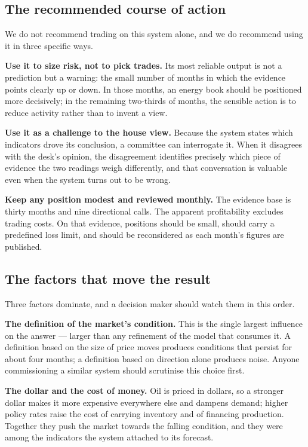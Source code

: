 \documentclass[11pt,a4paper]{article}
\begin{document}
\subsection{The recommended course of action}

We do not recommend trading on this system alone, and we do recommend using it in three specific
ways.

\textbf{Use it to size risk, not to pick trades.} Its most reliable output is not a prediction but
a warning: the small number of months in which the evidence points clearly up or down. In those
months, an energy book should be positioned more decisively; in the remaining two-thirds of months,
the sensible action is to reduce activity rather than to invent a view.

\textbf{Use it as a challenge to the house view.} Because the system states which indicators drove
its conclusion, a committee can interrogate it. When it disagrees with the desk's opinion, the
disagreement identifies precisely which piece of evidence the two readings weigh differently, and
that conversation is valuable even when the system turns out to be wrong.

\textbf{Keep any position modest and reviewed monthly.} The evidence base is thirty months and nine
directional calls. The apparent profitability excludes trading costs. On that evidence, positions
should be small, should carry a predefined loss limit, and should be reconsidered as each month's
figures are published.

\subsection{The factors that move the result}

Three factors dominate, and a decision maker should watch them in this order.

\textbf{The definition of the market's condition.} This is the single largest influence on the
answer --- larger than any refinement of the model that consumes it. A definition based on the size
of price moves produces conditions that persist for about four months; a definition based on
direction alone produces noise. Anyone commissioning a similar system should scrutinise this
choice first.

\textbf{The dollar and the cost of money.} Oil is priced in dollars, so a stronger dollar makes it
more expensive everywhere else and dampens demand; higher policy rates raise the cost of carrying
inventory and of financing production. Together they push the market towards the falling condition,
and they were among the indicators the system attached to its forecast.
\end{document}
